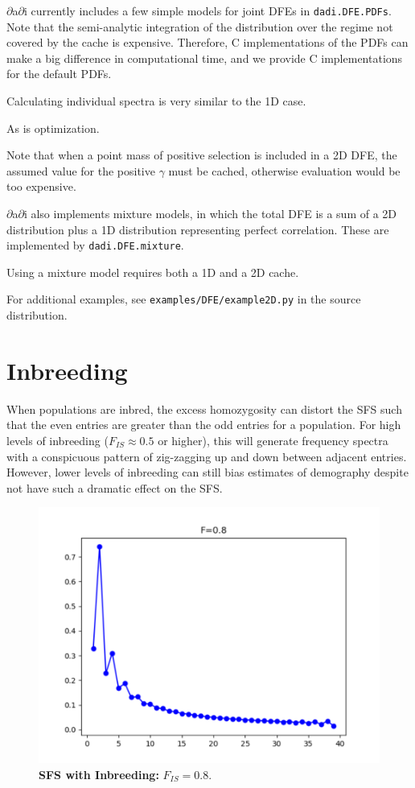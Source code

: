 \documentclass[12pt]{article}
\newcommand{\dadi}{$\partial$a$\partial$i\xspace}
\begin{document}
\dadi currently includes a few simple models for joint DFEs in \texttt{dadi.DFE.PDFs}.
Note that the semi-analytic integration of the distribution over the regime not covered by the cache is expensive.
Therefore, C implementations of the PDFs can make a big difference in computational time, and we provide
C implementations for the default PDFs.

Calculating individual spectra is very similar to the 1D case.

As is optimization.

Note that when a point mass of positive selection is included in a 2D DFE, the assumed value for the positive $\gamma$ must be cached, otherwise evaluation would be too expensive.

\dadi also implements mixture models, in which the total DFE is a sum of a 2D distribution plus a 1D distribution representing perfect correlation.
These are implemented by \texttt{dadi.DFE.mixture}.

Using a mixture model requires both a 1D and a 2D cache.

For additional examples, see \texttt{examples/DFE/example2D.py} in the source distribution.

\section{Inbreeding}

When populations are inbred, the excess homozygosity can distort the SFS such that the even entries are greater than the odd entries for a population.
For high levels of inbreeding ($F_{IS} \approx 0.5$ or higher), this will generate frequency spectra with a conspicuous pattern of zig-zagging up and down between adjacent entries. 
However, lower levels of inbreeding can still bias estimates of demography despite not have such a dramatic effect on the SFS.

\begin{figure}[h]
\centering
\includegraphics[scale=0.5]{InbreedingSFS}
\caption{\textbf{SFS with Inbreeding:} $F_{IS}=0.8$.\label{fig:inbreeding_sfs}}
\end{figure}
\end{document}
